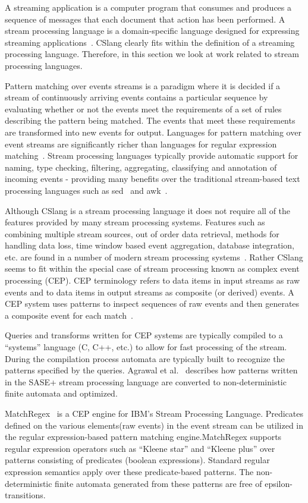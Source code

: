 A streaming application
is a computer program
that consumes and
produces
a sequence of messages that each document that action has been performed.
A stream processing language is a domain-specific language
designed for expressing streaming applications~\cite{DBLP:journals/sigmod/HirzelBBVSV18}. CSlang clearly
fits within the definition of a streaming processing language.
Therefore, in this
section we look at work related to stream processing languages.

Pattern matching
over events streams is a paradigm
where it is decided if a stream of continuously arriving events
contains a particular sequence by evaluating whether or not
the events meet the requirements of a set of rules describing
the pattern being matched.
The events that meet these requirements are
transformed into new events for output.
Languages for pattern matching over event
streams are significantly richer than languages for regular expression
matching~\cite{DBLP:conf/sigmod/AgrawalDGI08}.
Stream processing languages typically provide automatic
support for naming, type checking, filtering, aggregating, classifying and
annotation of incoming events - providing many benefits over the traditional
stream-based text processing languages such as sed~\cite{Mcmahon1979sed} and
awk~\cite{DBLP:journals/spe/AhoKW79}.

Although CSlang is a stream processing language it does not
require all of the features provided by many stream processing systems. Features
such as combining multiple stream sources, out of order data retrieval, methods
for handling data loss, time window based event aggregation, database
integration, etc. are found in a number of modern stream processing
systems~\cite{DBLP:journals/csur/DayarathnaP18}.   Rather CSlang seems to fit within the special case of
stream processing known as complex event processing (CEP). CEP terminology refers
to data items in input streams as raw events and to data items in output streams
as composite (or derived) events. A CEP system uses patterns to inspect
sequences of raw events and then generates a composite event for each
match~\cite{DBLP:journals/ibmrd/HirzelAGJKKMNSSW13}.

Queries and transforms written for CEP systems are
typically compiled to a “systems” language (C, C++, etc.) to allow for fast
processing of the stream. During the compilation process automata are typically
built to recognize the patterns specified by the queries. Agrawal et
al.~\cite{DBLP:conf/sigmod/AgrawalDGI08} describes how patterns written in the SASE+ stream
processing language are converted to non-deterministic finite automata and
optimized.

MatchRegex~\cite{DBLP:conf/debs/Hirzel12} is a CEP engine for IBM’s Stream Processing
Language. Predicates defined on the various elements(raw events) in the event
stream can be utilized in the regular expression-based pattern matching
engine.MatchRegex supports regular expression operators such as “Kleene star”
and “Kleene plus” over patterns consisting of predicates (boolean expressions).
Standard regular expression semantics apply over these predicate-based patterns.
The non-deterministic finite automata generated from these patterns are free of
epsilon-transitions.
